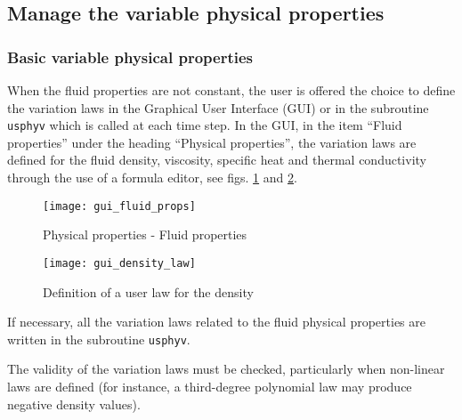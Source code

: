 {{{%
\subsection{Manage the variable physical properties}
\subsubsection{Basic variable physical properties}\label{sec:usphyv}
When the fluid properties are not constant, the user is offered the choice to define the variation laws in the Graphical User Interface (GUI) or in the subroutine \texttt{usphyv} which is called at each time step. In the GUI, in the item ``Fluid properties'' under the heading ``Physical properties'', the variation laws are defined for the fluid density, viscosity, specific heat and thermal conductivity through the use of a formula editor, see figs. \ref{fig:V-60_GUI} and \ref{fig:UL1_GUI}.
%
\begin{figure}[!ht]
\begin{center}
\texttt{[image: gui\_fluid\_props]}
\caption{Physical properties - Fluid properties}
\label{fig:V-60_GUI}
\end{center}
\end{figure}
%
\begin{figure}[!ht]
\begin{center}
\texttt{[image: gui\_density\_law]}
\caption{Definition of a user law for the density}
\label{fig:UL1_GUI}
\end{center}
\end{figure}

If necessary, all the variation laws related to the fluid physical properties are written in the subroutine \texttt{usphyv}.

The validity of the variation laws must be checked, particularly when
non-linear laws are defined (for instance, a third-degree polynomial law
may produce negative density values).

}}}
